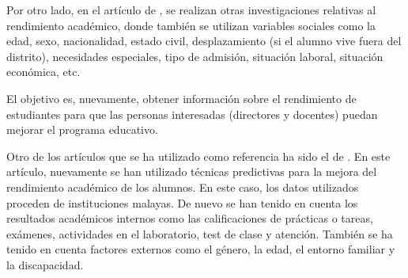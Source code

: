 Por otro lado, en el artículo de , se realizan otras investigaciones relativas al rendimiento académico, donde también se utilizan variables sociales como la edad, sexo, nacionalidad, estado civil, desplazamiento (si el alumno vive fuera del distrito), necesidades especiales, tipo de admisión, situación laboral, situación económica, etc.


El objetivo es, nuevamente, obtener información sobre el rendimiento de estudiantes para que las personas interesadas (directores y docentes) puedan mejorar el programa educativo. %

Otro de los artículos que se ha utilizado como referencia ha sido el de . En este artículo, nuevamente se han utilizado técnicas predictivas para la mejora del rendimiento académico de los alumnos. En este caso, los datos utilizados proceden de instituciones malayas. De nuevo se han tenido en cuenta los resultados académicos internos como las calificaciones de prácticas o tareas, exámenes, actividades en el laboratorio, test de clase y atención. También se ha tenido en cuenta factores externos como el género, la edad, el entorno familiar y la discapacidad. 

